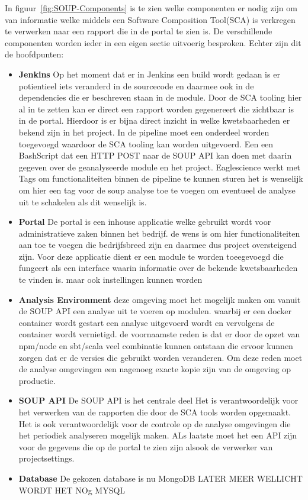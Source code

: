 In figuur~\ref{fig:SOUP-Components} is te zien welke componenten er nodig zijn om van informatie welke middels een Software Composition Tool(SCA) is verkregen te verwerken naar een rapport die in de portal te zien is. De verschillende componenten worden ieder in een eigen sectie uitvoerig besproken. Echter zijn dit de hoofdpunten:
\begin{itemize}
    \item \textbf{Jenkins} Op het moment dat er in Jenkins een build wordt gedaan is er potientieel iets veranderd in de sourcecode en daarmee ook in de dependencies die er beschreven staan in de module. Door de SCA tooling hier al in te zetten kan er direct een rapport worden gegenereert die zichtbaar is in de portal. Hierdoor is er bijna direct inzicht in welke kwetsbaarheden er bekend zijn in het project. In de pipeline moet een onderdeel worden toegevoegd waardoor de SCA tooling kan worden uitgevoerd. Een een BashScript dat een HTTP POST naar de SOUP API kan doen met daarin gegeven over de geanalyseerde module en het project. Eaglescience werkt met Tags om functionaliteiten binnen de pipeline te kunnen sturen het is wenselijk om hier een tag voor de soup analyse toe te voegen om eventueel de analyse uit te schakelen als dit wenselijk is.
    \item \textbf{Portal} De portal is een inhouse applicatie welke gebruikt wordt voor administratieve zaken binnen het bedrijf. de wens is om hier functionaliteiten aan toe te voegen die bedrijfsbreed zijn en daarmee dus project oversteigend zijn. Voor deze applicatie dient er een module te worden toeegevoegd die fungeert als een interface waarin informatie over de bekende kwetsbaarheden te vinden is. maar ook instellingen kunnen worden
    \item \textbf{Analysis Environment} deze omgeving moet het mogelijk maken om vanuit de SOUP API een analyse uit te voeren op modulen. waarbij er een docker container wordt gestart een analyse uitgevoerd wordt en vervolgens de container wordt vernietigd. de voornaamste reden is dat er door de opzet van npm/node en sbt/scala veel combinatie kunnen ontstaan die ervoor kunnen zorgen dat er de versies die gebruikt worden veranderen. Om deze reden moet de analyse omgevingen een nagenoeg exacte kopie zijn van de omgeving op productie.
    \item \textbf{SOUP API} De SOUP API is het centrale deel Het is verantwoordelijk voor het verwerken van de rapporten die door de SCA tools worden opgemaakt. Het is ook verantwoordelijk voor de controle op de analyse omgevingen die het periodiek analyseren mogelijk maken. ALs laatste moet het een API zijn voor de gegevens die op de portal te zien zijn alsook de verwerker van projectsettings.
    \item \textbf{Database} De gekozen database is nu MongoDB LATER MEER WELLICHT WORDT HET NOg MYSQL
\end{itemize}


